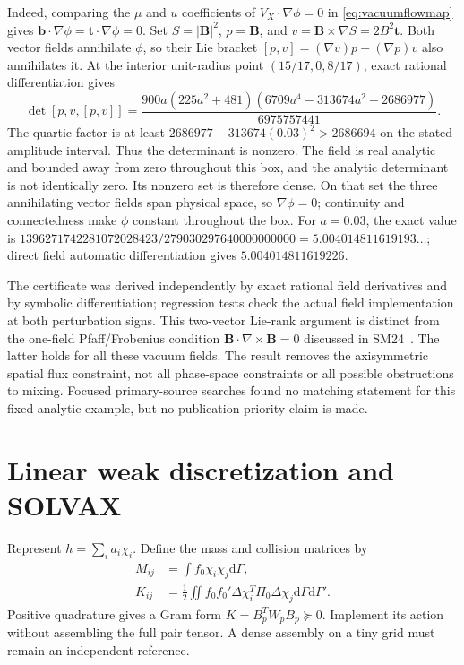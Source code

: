 \documentclass[11pt,letterpaper]{article}
\newcommand{\dd}{\mathrm d}
\begin{document}
Indeed, comparing the $\mu$ and $u$ coefficients of
$V_X\cdot\nabla\phi=0$ in \eqref{eq:vacuumflowmap} gives
$\mathbf b\cdot\nabla\phi=\mathbf t\cdot\nabla\phi=0$.
Set $S=|\mathbf B|^2$, $p=\mathbf B$, and
$v=\mathbf B\times\nabla S=2B^2\mathbf t$. Both vector fields annihilate
$\phi$, so their Lie bracket
$[p,v]=(\nabla v)p-(\nabla p)v$ also annihilates it.
At the interior unit-radius point $(15/17,0,8/17)$, exact rational
differentiation gives
\begin{equation}
 \det[p,v,[p,v]]=
 \frac{900a(225a^2+481)(6709a^4-313674a^2+2686977)}{6975757441}.
 \label{eq:nonaxisrankcertificate}
\end{equation}
The quartic factor is at least
$2686977-313674(0.03)^2>2686694$ on the stated amplitude interval.
Thus the determinant is nonzero. The field is real analytic and bounded
away from zero throughout this box, and the analytic determinant is not
identically zero. Its nonzero set is therefore dense. On that set the
three annihilating vector fields span physical space, so $\nabla\phi=0$;
continuity and connectedness make $\phi$ constant throughout the box.
For $a=0.03$, the exact value is
$1396271742281072028423/279030297640000000000
 =5.004014811619193\ldots$; direct field automatic differentiation gives
$5.004014811619226$.

The certificate was derived independently by exact rational field
derivatives and by symbolic differentiation; regression tests check the
actual field implementation at both perturbation signs.
This two-vector Lie-rank argument is distinct from the one-field
Pfaff/Frobenius condition $\mathbf B\cdot\nabla\times\mathbf B=0$
discussed in SM24~\cite{SM24}. The latter holds for all these vacuum fields.
The result removes the axisymmetric spatial flux constraint, not all
phase-space constraints or all possible obstructions to mixing. Focused
primary-source searches found no matching statement for this fixed analytic
example, but no publication-priority claim is made.

\section{Linear weak discretization and SOLVAX}

Represent $h=\sum_i a_i\chi_i$. Define the mass and collision matrices by
\begin{align}
 M_{ij}&=\int f_0\chi_i\chi_j\dd\Gamma,\\
 K_{ij}&=\frac12\iint f_0f_0'\Delta\chi_i^T\Pi_0\Delta\chi_j
 \dd\Gamma\dd\Gamma'.
 \label{eq:gram}
\end{align}
Positive quadrature gives a Gram form $K=B_p^TW_pB_p\succeq0$. Implement its
action without assembling the full pair tensor. A dense assembly on a tiny grid
must remain an independent reference.
\end{document}
